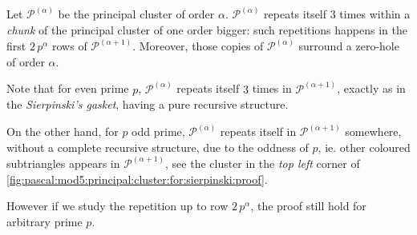\begin{theorem}
    Let $\mathcal{P}^{(\alpha)}$ be the principal cluster of order $\alpha$. 
    $\mathcal{P}^{(\alpha)}$ repeats itself $3$ times within a
    \emph{chunk} of the principal cluster of one order bigger: such repetitions
    happens in the first $2\,p^{\alpha}$ rows of $\mathcal{P}^{(\alpha+1)}$.
    Moreover, those copies of $\mathcal{P}^{(\alpha)}$ surround a zero-hole of
    order $\alpha$. 
\end{theorem}

Note that for even prime $p$, $\mathcal{P}^{(\alpha)}$ repeats
itself $3$ times in $\mathcal{P}^{(\alpha+1)}$, exactly as in the
\emph{Sierpinski's gasket}, having a pure recursive structure.


On the other hand, for $p$ odd prime, $\mathcal{P}^{(\alpha)}$ repeats itself
in $\mathcal{P}^{(\alpha+1)}$ somewhere, without a complete recursive
structure, due to the oddness of $p$, ie. other coloured subtriangles appears
in $\mathcal{P}^{(\alpha+1)}$, see the cluster in the \emph{top left} corner of
\autoref{fig:pascal:mod5:principal:cluster:for:sierpinski:proof}.

However if we study the repetition up to row
$2\,p^{\alpha}$, the proof still hold for arbitrary prime $p$.

\iffalse
, while in general we can say that maximal
triangles of coefficients multiples of $p$, appear with regularity in
$\mathcal{P}_{n+1}$ a number of times equals to:
\begin{displaymath}
    \frac{(p-1)p}{2}
\end{displaymath}
in other words, considering triangles $\mathcal{P}_{n}$ and
$\mathcal{P}_{n+1}$, there are $\frac{(p-1)p}{2}$ upside-down
maximal triangles, with all coefficients multiple of $p$, from row $p^n$
to row $p^{n+1}-1$; this result will be prove at the end of this 
section.
\fi

